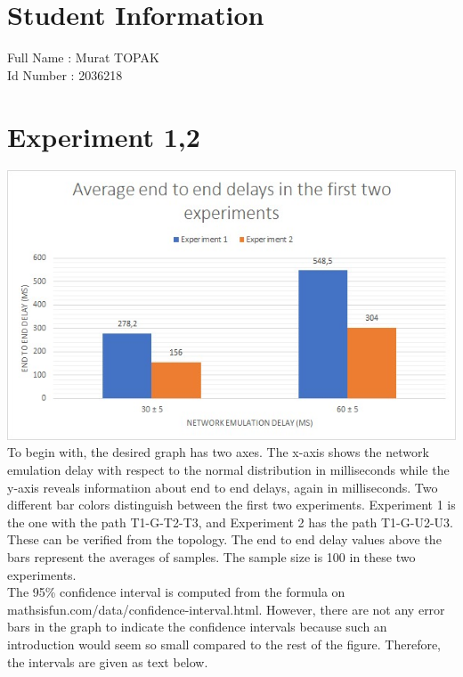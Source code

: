 \documentclass[12pt]{article}
\begin{document}
\section*{Student Information } 
Full Name :  Murat TOPAK\\
Id Number :  2036218\\

\section*{Experiment 1,2}
\includegraphics[scale=0.8]{graph.jpg}
\\


To begin with, the desired graph has two axes. The x-axis shows the network emulation delay with respect to the normal distribution in milliseconds while the y-axis reveals informatiıon about end to end delays, again in milliseconds. Two different bar colors distinguish between the first two experiments. Experiment 1 is the one with the path T1-G-T2-T3, and Experiment 2 has the path T1-G-U2-U3. These can be verified from the topology.
The end to end delay values above the bars represent the averages of samples. The sample size is 100 in these two experiments. 
\\

The 95\% confidence interval is computed from the formula on mathsisfun.com/data/confidence-interval.html. However, there are not any error bars in the graph to indicate the confidence intervals because such an introduction would seem so small compared to the rest of the figure. Therefore, the intervals are given as text below. 
\\
\end{document}
